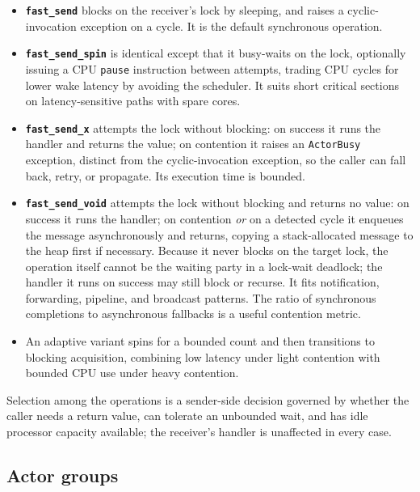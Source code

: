 \documentclass[11pt]{article}
\newcommand{\fs}{\texttt{fast\_send}}
\begin{document}
\begin{itemize}[leftmargin=1.4em]
  \item \textbf{\fs{}} blocks on the receiver's lock by sleeping, and raises a
  cyclic-invocation exception on a cycle. It is the default synchronous
  operation.
  \item \textbf{\texttt{fast\_send\_spin}} is identical except that it
  busy-waits on the lock, optionally issuing a CPU \texttt{pause} instruction between
  attempts, trading CPU cycles for lower wake latency by avoiding the scheduler.
  It suits short critical sections on latency-sensitive paths with spare cores.
  \item \textbf{\texttt{fast\_send\_x}} attempts the lock without blocking:
  on success it runs the handler and returns the value; on contention it raises
  an \texttt{ActorBusy} exception, distinct from the cyclic-invocation
  exception, so the caller can fall back, retry, or propagate. Its execution
  time is bounded.
  \item \textbf{\texttt{fast\_send\_void}} attempts the lock without blocking and
  returns no value: on success it runs the handler; on contention \emph{or} on a
  detected cycle it enqueues the message asynchronously and returns, copying a
  stack-allocated message to the heap first if necessary. Because it never blocks
  on the target lock, the operation itself cannot be the waiting party in a
  lock-wait deadlock; the handler it runs on success may still block or recurse.
  It fits notification, forwarding, pipeline, and broadcast patterns. The ratio
  of synchronous completions to asynchronous fallbacks is a useful contention
  metric.
  \item An adaptive variant spins for a bounded count and then transitions to
  blocking acquisition, combining low latency under light contention with
  bounded CPU use under heavy contention.
\end{itemize}

Selection among the operations is a sender-side decision governed by whether the
caller needs a return value, can tolerate an unbounded wait, and has idle
processor capacity available; the receiver's handler is unaffected in every case.

\subsection{Actor groups}
\label{sec:groups}
\end{document}

